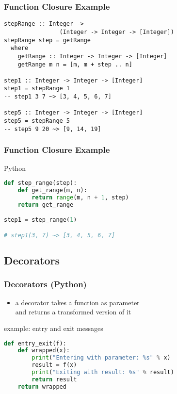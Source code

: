 \documentclass[dvipsnames]{beamer}
\theoremstyle{plain}
\begin{document}
\begin{frame}[fragile]
  \frametitle{Function Closure Example}

  \begin{exampleblock}{}
    \begin{lstlisting}
stepRange :: Integer ->
                (Integer -> Integer -> [Integer])
stepRange step = getRange
  where
    getRange :: Integer -> Integer -> [Integer]
    getRange m n = [m, m + step .. n]

step1 :: Integer -> Integer -> [Integer]
step1 = stepRange 1
-- step1 3 7 ~> [3, 4, 5, 6, 7]

step5 :: Integer -> Integer -> [Integer]
step5 = stepRange 5
-- step5 9 20 ~> [9, 14, 19]
    \end{lstlisting}
  \end{exampleblock}
\end{frame}

\begin{frame}[fragile]
  \frametitle{Function Closure Example}

  \begin{exampleblock}{Python}
    \begin{lstlisting}[language=Python]
def step_range(step):
    def get_range(m, n):
        return range(m, n + 1, step)
    return get_range

step1 = step_range(1)

# step1(3, 7) ~> [3, 4, 5, 6, 7]
    \end{lstlisting}
  \end{exampleblock}
\end{frame}

\subsection{Decorators}

\begin{frame}[fragile]
  \frametitle{Decorators (Python)}

  \begin{itemize}
    \item a decorator takes a function as parameter\\
      and returns a transformed version of it
  \end{itemize}

  \begin{exampleblock}{example: entry and exit messages}
    \begin{lstlisting}[language=Python]
def entry_exit(f):
    def wrapped(x):
        print("Entering with parameter: %s" % x)
        result = f(x)
        print("Exiting with result: %s" % result)
        return result
    return wrapped
    \end{lstlisting}
  \end{exampleblock}
\end{frame}
\end{document}
